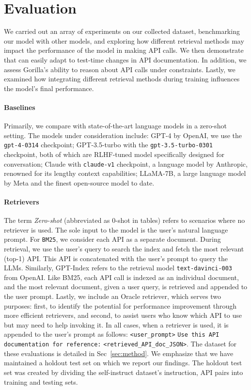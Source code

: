 \section{Evaluation}
\label{sec:eval}
We carried out an array of experiments on our collected dataset, benchmarking our model \gorilla{} with other models, and exploring how different retrieval methods may impact the performance of the model in making API calls. We then demonstrate that \gorilla{} can easily adapt to test-time changes in API documentation. In addition, we assess Gorilla's ability to reason about API calls under constraints. Lastly, we examined how integrating different retrieval methods during training influences the model's final performance.

\paragraph{Baselines} Primarily, we compare \oursmethod{} with state-of-the-art language models in a zero-shot setting. The models under consideration include: GPT-4 by OpenAI, we use the \texttt{gpt-4-0314} checkpoint; GPT-3.5-turbo with the \texttt{gpt-3.5-turbo-0301} checkpoint, both of which are RLHF-tuned model specifically designed for conversation; Claude with \texttt{claude-v1} checkpoint, a language model by Anthropic, renowned for its lengthy context capabilities; LLaMA-7B, a large language model by Meta and the finest open-source model to date.

\paragraph{Retrievers} The term \emph{Zero-shot} (abbreviated as 0-shot in tables) refers to scenarios where no retriever is used. The sole input to the model is the user's natural language prompt. For \texttt{BM25}, we consider each API as a separate document. During retrieval, we use the user's query to search the index and fetch the most relevant (top-1) API. 
This API is concatenated with the user's prompt to query the LLMs. Similarly, GPT-Index refers to the retrieval model \texttt{text-davinci-003} from OpenAI. Like BM25, each API call is indexed as an individual document, and the most relevant document, given a user query, is retrieved and appended to the user prompt. Lastly, we include an Oracle retriever, which serves two purposes: first, to identify the potential for performance improvement through more efficient retrievers, and second, to assist users who know which API to use but may need to help invoking it. 
In all cases, when a retriever is used, it is appended to the user's prompt as follows: \texttt{<user\_prompt>} \texttt{Use this API documentation for reference:} \texttt{<retrieved\_API\_doc\_JSON>}. 
The dataset for these evaluations is detailed in Sec~\ref{sec:method}. We emphasize that we have maintained a holdout test set on which we report our findings. The holdout test set was created by dividing the self-instruct dataset's {instruction, API} pairs into training and testing sets.


